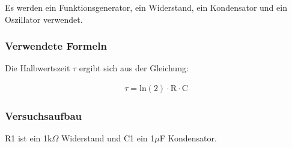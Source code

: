 \documentclass[12pt,a4paper]{article}
\begin{document}
Es werden ein Funktionsgenerator, ein Widerstand, ein Kondensator und ein Oszillator verwendet.

\subsubsection{Verwendete Formeln}

Die Halbwertszeit $\tau$ ergibt sich aus der Gleichung:

\begin{align}
\tau = \text{ln}(2) \cdot \text{R} \cdot \text{C}
\label{eqn:tau}
\end{align}

\subsubsection{Versuchsaufbau}

R1 ist ein 1k$\Omega$ Widerstand und C1 ein 1$\mu$F Kondensator.
\end{document}
